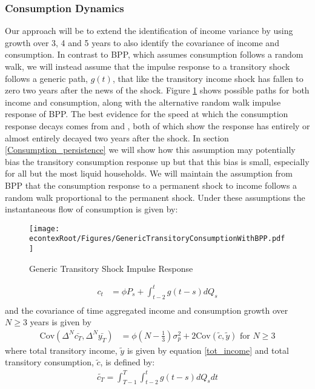 \documentclass[titlepage]{\econtex}\newcommand{\texname}{ConsumptionHeterogeneity}
\begin{document}
\subsubsection{Consumption Dynamics}
Our approach will be to extend the identification of income variance by using growth over 3, 4 and 5 years to also identify the covariance of income and consumption. In contrast to BPP, which assumes consumption follows a random walk, we will instead assume that the impulse response to a transitory shock follows a generic path, $g(t)$, that like the transitory income shock has fallen to zero two years after the news of the shock. Figure \ref{fig:GenericTransitoryBPP} shows possible paths for both income and consumption, along with the alternative random walk impulse response of BPP. The best evidence for the speed at which the consumption response decays comes from \cite{gelman_what_2016} and \cite{fagereng_mpc_2016}, both of which show the response has entirely or almost entirely decayed two years after the shock. In section \ref{Consumption_persistence} we will show how this assumption may potentially bias the transitory consumption response up but that this bias is small, especially for all but the most liquid households. We will maintain the assumption from BPP that the consumption response to a permanent shock to income follows a random walk proportional to the permanent shock. Under these assumptions the instantaneous flow of consumption is given by:	\begin{figure} 
	\begin{centering}
		\texttt{[image: \\econtexRoot/Figures/GenericTransitoryConsumptionWithBPP.pdf]} 
		\caption{Generic Transitory Shock Impulse Response}
		\label{fig:GenericTransitoryBPP}
	\end{centering}
\end{figure}
\begin{align*}
c_t  &= \phi P_s  + \int_{t-2}^{t} g(t-s)dQ_s  \\
\end{align*}
and the covariance of time aggregated income and consumption growth over $N \geq 3$ years is given by
\begin{align}
\mathrm{Cov}(\Delta^N \bar{c_T},\Delta^N \bar{y_T} ) &= \phi (N-\frac{1}{3}) \sigma^2_p + 2 \mathrm{Cov}(\tilde{c},\tilde{y}) \text{  for  } N\geq 3 \label{covariance}
\end{align}
where total transitory income, $\tilde{y}$ is given by equation \ref{tot_income} and total transitory consumption, $\tilde{c}$, is defined by:
\begin{align}
\tilde{c_T} = \int_{T-1}^{T}\int_{t-2}^{t} g(t-s)dQ_s dt \label{tot_cons}
\end{align}
\end{document}
